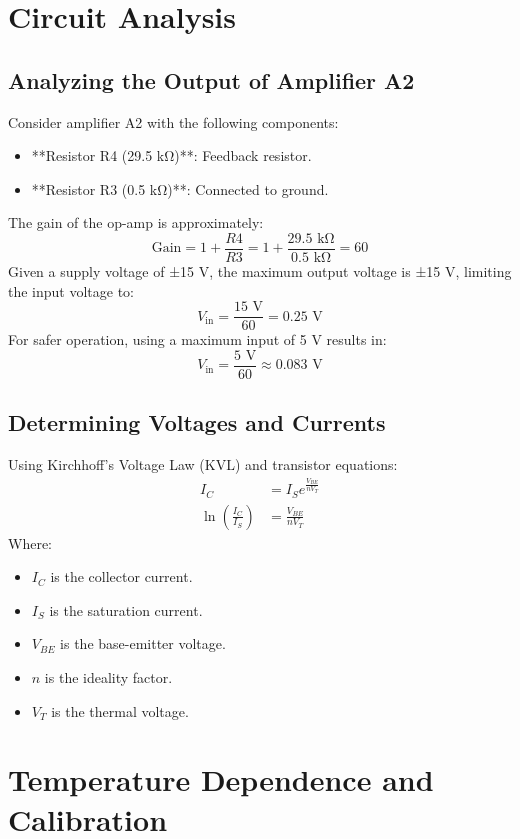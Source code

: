 \section{Circuit Analysis}

\subsection{Analyzing the Output of Amplifier A2}

Consider amplifier A2 with the following components:
\begin{itemize}
    \item **Resistor R4 (29.5 kΩ)**: Feedback resistor.
    \item **Resistor R3 (0.5 kΩ)**: Connected to ground.
\end{itemize}
The gain of the op-amp is approximately:
\[
\text{Gain} = 1 + \frac{R4}{R3} = 1 + \frac{29.5 \text{ kΩ}}{0.5 \text{ kΩ}} = 60
\]
Given a supply voltage of ±15 V, the maximum output voltage is ±15 V, limiting the input voltage to:
\[
V_{\text{in}} = \frac{15 \text{ V}}{60} = 0.25 \text{ V}
\]
For safer operation, using a maximum input of 5 V results in:
\[
V_{\text{in}} = \frac{5 \text{ V}}{60} \approx 0.083 \text{ V}
\]

\subsection{Determining Voltages and Currents}

Using Kirchhoff's Voltage Law (KVL) and transistor equations:
\begin{align}
    I_C &= I_S e^{\frac{V_{BE}}{n V_T}} \\
    \ln\left(\frac{I_C}{I_S}\right) &= \frac{V_{BE}}{n V_T}
\end{align}
Where:
\begin{itemize}
    \item \( I_C \) is the collector current.
    \item \( I_S \) is the saturation current.
    \item \( V_{BE} \) is the base-emitter voltage.
    \item \( n \) is the ideality factor.
    \item \( V_T \) is the thermal voltage.
\end{itemize}

\section{Temperature Dependence and Calibration}

